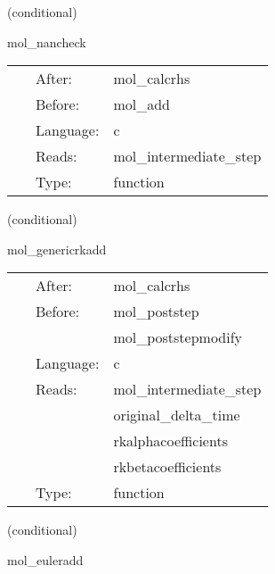 \vspace{5mm}

   (conditional) 

\hspace{5mm} mol\_nancheck 

\hspace{5mm}{\it check the rhs gfs for nans } 


\hspace{5mm}

 \begin{tabular*}{160mm}{cll} 
~ & After:  & mol\_calcrhs \\ 
~ & Before:  & mol\_add \\ 
~ & Language:  & c \\ 
~ & Reads:  & mol\_intermediate\_step \\ 
~ & Type:  & function \\ 
\end{tabular*} 


\vspace{5mm}

   (conditional) 

\hspace{5mm} mol\_genericrkadd 

\hspace{5mm}{\it updates calculated with a generic method } 


\hspace{5mm}

 \begin{tabular*}{160mm}{cll} 
~ & After:  & mol\_calcrhs \\ 
~ & Before:  & mol\_poststep \\ 
~& ~ &mol\_poststepmodify\\ 
~ & Language:  & c \\ 
~ & Reads:  & mol\_intermediate\_step \\ 
~& ~ &original\_delta\_time\\ 
~& ~ &rkalphacoefficients\\ 
~& ~ &rkbetacoefficients\\ 
~ & Type:  & function \\ 
\end{tabular*} 


\vspace{5mm}

   (conditional) 

\hspace{5mm} mol\_euleradd 

